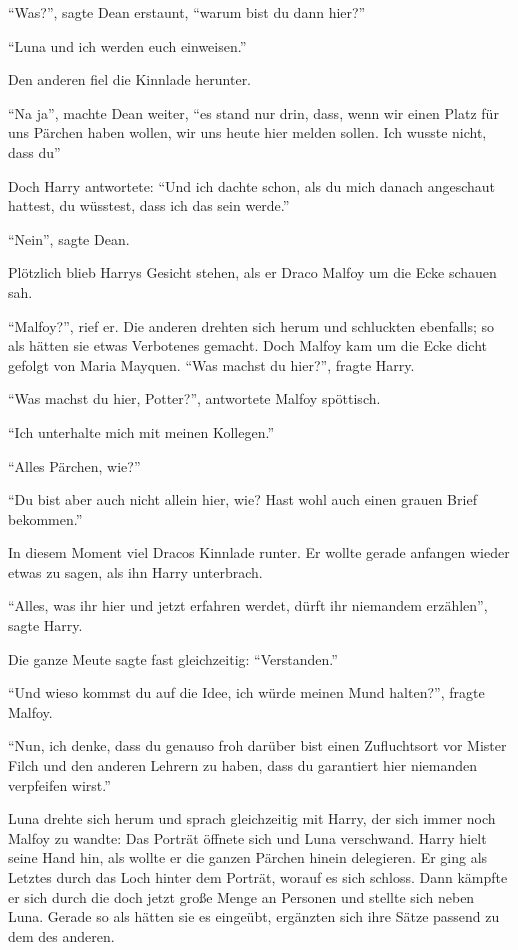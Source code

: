 \enquote{Was?}, sagte Dean erstaunt, \enquote{warum bist du dann hier?}

\enquote{Luna und ich werden euch einweisen.}

Den anderen fiel die Kinnlade herunter.

\enquote{Na ja}, machte Dean weiter, \enquote{es stand nur drin, dass, wenn wir einen Platz für uns Pärchen haben wollen, wir uns heute hier melden sollen. Ich wusste nicht, dass du\abs}

Doch Harry antwortete: \enquote{Und ich dachte schon, als du mich danach angeschaut hattest, du wüsstest, dass ich das sein werde.}

\enquote{Nein}, sagte Dean.

Plötzlich blieb Harrys Gesicht stehen, als er Draco Malfoy um die Ecke schauen sah.

\enquote{Malfoy?}, rief er. Die anderen drehten sich herum und schluckten ebenfalls; so als hätten sie etwas Verbotenes gemacht. Doch Malfoy kam um die Ecke dicht gefolgt von Maria Mayquen. \enquote{Was machst du hier?}, fragte Harry.

\enquote{Was machst du hier, Potter?}, antwortete Malfoy spöttisch.

\enquote{Ich unterhalte mich mit meinen Kollegen.}

\enquote{Alles Pärchen, wie?}

\enquote{Du bist aber auch nicht allein hier, wie? Hast wohl auch einen grauen Brief bekommen.}

In diesem Moment viel Dracos Kinnlade runter. Er wollte gerade anfangen wieder etwas zu sagen, als ihn Harry unterbrach.

\enquote{Alles, was ihr hier und jetzt erfahren werdet, dürft ihr niemandem erzählen}, sagte Harry.

Die ganze Meute sagte fast gleichzeitig: \enquote{Verstanden.}

\enquote{Und wieso kommst du auf die Idee, ich würde meinen Mund halten?}, fragte Malfoy.

\enquote{Nun, ich denke, dass du genauso froh darüber bist einen Zufluchtsort vor Mister Filch und den anderen Lehrern zu haben, dass du garantiert hier niemanden verpfeifen wirst.}

Luna drehte sich herum und sprach gleichzeitig mit Harry, der sich immer noch Malfoy zu wandte:  Das Porträt öffnete sich und Luna verschwand. Harry hielt seine Hand hin, als wollte er die ganzen Pärchen hinein delegieren. Er ging als Letztes durch das Loch hinter dem Porträt, worauf es sich schloss. Dann kämpfte er sich durch die doch jetzt große Menge an Personen und stellte sich neben Luna. Gerade so als hätten sie es eingeübt, ergänzten sich ihre Sätze passend zu dem des anderen.

